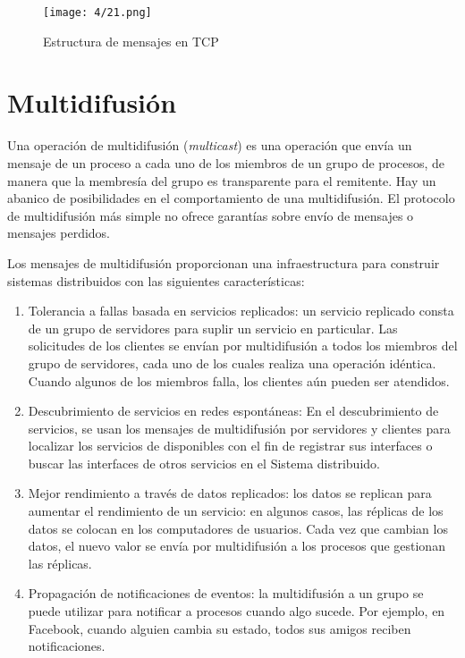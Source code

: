 \begin{figure}
	\texttt{[image: 4/21.png]}
	\caption{Estructura de mensajes en TCP}
	\label{fig:TCP-seg-estruc}
\end{figure}
 


\section{Multidifusi\'on }

Una operación de multidifusión (\textit{multicast}) es  una operación que envía un   mensaje de un proceso a cada uno de los miembros de un grupo de procesos, de manera que la membresía  del grupo es transparente para el remitente. Hay un abanico de posibilidades en el   comportamiento de una multidifusión. El protocolo de multidifusión más simple no ofrece garantías sobre  envío de mensajes o mensajes perdidos.

Los mensajes de multidifusión proporcionan una infraestructura  para construir sistemas distribuidos  con las siguientes características:
\begin{enumerate}
	\item  Tolerancia a fallas basada en servicios replicados: un servicio replicado consta de un  grupo de servidores para suplir un servicio en particular. Las solicitudes de los clientes se envían por multidifusión a todos los miembros del grupo de servidores,  cada uno de los cuales realiza una operación idéntica. Cuando algunos de los miembros
	falla, los clientes aún pueden ser atendidos.  
	
	\item Descubrimiento de servicios en redes espontáneas: En el \gls{descubrimiento de servicios}, se usan los mensajes de multidifusión por servidores y clientes para localizar los servicios de  disponibles con el fin de  registrar sus interfaces o buscar las interfaces de otros servicios en el  Sistema distribuido.  
	
	\item  Mejor rendimiento a través de datos replicados: los datos se replican para aumentar el  rendimiento de un servicio: en algunos casos, las réplicas de los datos se colocan en los computadores de usuarios. Cada vez que cambian los datos, el nuevo valor se envía por multidifusión a los procesos que gestionan las réplicas.  
	
	\item Propagación de notificaciones de eventos: la multidifusión a un grupo se puede utilizar para notificar  a procesos cuando algo sucede. Por ejemplo, en Facebook, cuando alguien  cambia su estado, todos sus amigos reciben notificaciones.   
	
\end{enumerate}
